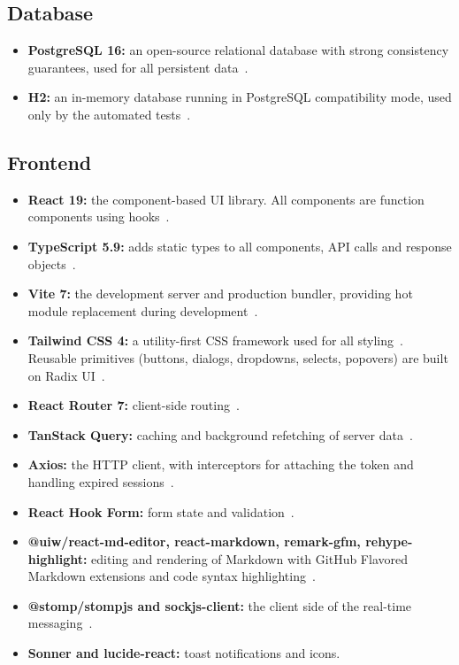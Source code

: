 \subsection*{Database}

\begin{itemize}
  \item \textbf{PostgreSQL 16:} an open-source relational database with strong
    consistency guarantees, used for all persistent data~\cite{postgresql}.
  \item \textbf{H2:} an in-memory database running in PostgreSQL compatibility mode,
    used only by the automated tests~\cite{h2}.
\end{itemize}

\subsection*{Frontend}

\begin{itemize}
  \item \textbf{React 19:} the component-based UI library. All components are function
    components using hooks~\cite{react}.
  \item \textbf{TypeScript 5.9:} adds static types to all components, API calls and
    response objects~\cite{typescript}.
  \item \textbf{Vite 7:} the development server and production bundler, providing hot
    module replacement during development~\cite{vite}.
  \item \textbf{Tailwind CSS 4:} a utility-first CSS framework used for all
    styling~\cite{tailwind}. Reusable primitives (buttons, dialogs, dropdowns, selects,
    popovers) are built on Radix UI~\cite{radix}.
  \item \textbf{React Router 7:} client-side routing~\cite{reactrouter}.
  \item \textbf{TanStack Query:} caching and background refetching of server
    data~\cite{tanstackquery}.
  \item \textbf{Axios:} the HTTP client, with interceptors for attaching the token and
    handling expired sessions~\cite{axios}.
  \item \textbf{React Hook Form:} form state and validation~\cite{reacthookform}.
  \item \textbf{@uiw/react-md-editor, react-markdown, remark-gfm, rehype-highlight:}
    editing and rendering of Markdown with GitHub Flavored Markdown extensions and code
    syntax highlighting~\cite{mdeditor,reactmarkdown}.
  \item \textbf{@stomp/stompjs and sockjs-client:} the client side of the real-time
    messaging~\cite{stompjs}.
  \item \textbf{Sonner and lucide-react:} toast notifications and icons.
\end{itemize}

